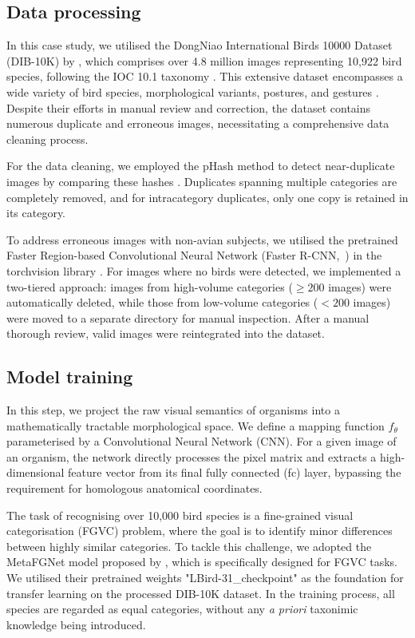 \subsection{Data processing}\label{subsec:mm-data-processing}

In this case study, we utilised the DongNiao International Birds 10000 Dataset (DIB-10K)
by \textcite{Mei2020Dongniao}, which comprises over 4.8 million images representing
10,922 bird species, following the IOC 10.1 taxonomy \parencite{Gill2021IOC}. This
extensive dataset encompasses a wide variety of bird species, morphological variants,
postures, and gestures \parencite{Mei2020Dongniao}. Despite their efforts in manual
review and correction, the dataset contains numerous duplicate and erroneous images,
necessitating a comprehensive data cleaning process.

For the data cleaning, we employed the pHash method to detect near-duplicate images
by comparing these hashes \parencite{Farid2021Overview}. Duplicates spanning multiple
categories are completely removed, and for intracategory duplicates, only one copy is
retained in its category.

To address erroneous images with non-avian subjects, we utilised the pretrained Faster
Region-based Convolutional Neural Network (Faster R-CNN,~\cite{Ren2017Faster}) in
the torchvision library \parencite{Ansel2024Pytorch}. For images where no birds were
detected, we implemented a two-tiered approach: images from high-volume categories
($\geq200$ images) were automatically deleted, while those from low-volume categories
($<200$ images) were moved to a separate directory for manual inspection.
After a manual thorough review, valid images were reintegrated into the dataset.

\subsection{Model training}\label{subsec:mm-model-training}

In this step, we project the raw visual semantics of organisms into a mathematically tractable morphological space. 
We define a mapping function $f_\theta$ parameterised by a Convolutional Neural Network (CNN). For a given image of an organism, the network directly processes the pixel matrix and extracts a high-dimensional feature vector from its final fully connected (fc) layer, bypassing the requirement for homologous anatomical coordinates.

The task of recognising over 10,000 bird species is a
fine-grained visual categorisation (FGVC) problem, where the goal is
to identify minor differences between highly similar categories. To
tackle this challenge, we adopted the MetaFGNet model proposed by \textcite{Zhang2018Fine},
which is specifically designed for FGVC tasks. We utilised their
pretrained weights "LBird-31\_checkpoint" as the foundation for
transfer learning on the processed DIB-10K dataset. In the training process,
all species are regarded as equal categories, without any \textit{a priori} taxonimic
knowledge being introduced.

